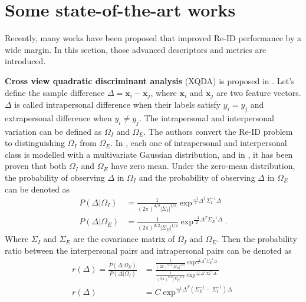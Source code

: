 %

\section{Some state-of-the-art works}
Recently, many works have been proposed that improved Re-ID performance by a wide margin. In this section, those advanced descriptors and metrics are introduced. 

\textbf{Cross view quadratic discriminant analysis} (XQDA) is proposed in \cite{LOMO}. Let's define the sample difference $\Delta = \bm{x}_i - \bm{x}_j$, where $\bm{x}_i $ and $\bm{x}_j$ are two feature vectors. $\Delta$ is called intrapersonal difference when their labels satisfy $y_i = y_j$ and extrapersonal difference when $y_i \ne y_j$. The intrapersonal and interpersonal variation can be defined as $\Omega_I$ and $\Omega_E$. The authors convert the Re-ID problem to distinguishing $\Omega_I$ from $\Omega_E$. In \cite{Bayeface}, each one of intrapersonal and interpersonal class is modelled with a multivariate Gaussian distribution, and in \cite{Bayeface}, it has been proven that both $\Omega_I$ and $\Omega_E$ have zero mean. Under the zero-mean distribution, the probability of observing $\Delta$ in $\Omega_I$ and the probability of observing $\Delta$ in $\Omega_E$ can be denoted as
\begin{equation}
\begin{aligned}
P(\Delta|\Omega_I) &= \frac{1}{(2\pi)^{d/2}|\Sigma_I|^{1/2}}\exp^{\frac{-1}{2}\Delta^T\Sigma_I^{-1}\Delta}\\
P(\Delta|\Omega_E) &= \frac{1}{(2\pi)^{d/2}|\Sigma_E|^{1/2}}\exp^{\frac{-1}{2}\Delta^T\Sigma_E^{-1}\Delta}.
\end{aligned}
\end{equation}
Where $\Sigma_I$ and $\Sigma_E$ are the covariance matrix of $\Omega_I$ and $\Omega_E$. Then the probability ratio between the interpersonal pairs and intrapersonal pairs can be denoted as
\begin{equation}
\begin{aligned}
r(\Delta) = \frac{P(\Delta|\Omega_E)}{P(\Delta|\Omega_I)}
	   &=\frac{\frac{1}{(2\pi)^{d/2}|\Sigma_E|^{1/2}}\exp^{\frac{-1}{2}\Delta^T\Sigma_E^{-1}\Delta}}{\frac{1}{(2\pi)^{d/2}|\Sigma_I|^{1/2}}\exp^{\frac{-1}{2}\Delta^T\Sigma_I^{-1}\Delta}}\\
r(\Delta)& =  C\exp^{\frac{-1}{2}\Delta^T(\Sigma_E^{-1} - \Sigma_I^{-1})\Delta}
\end{aligned}
\end{equation}
